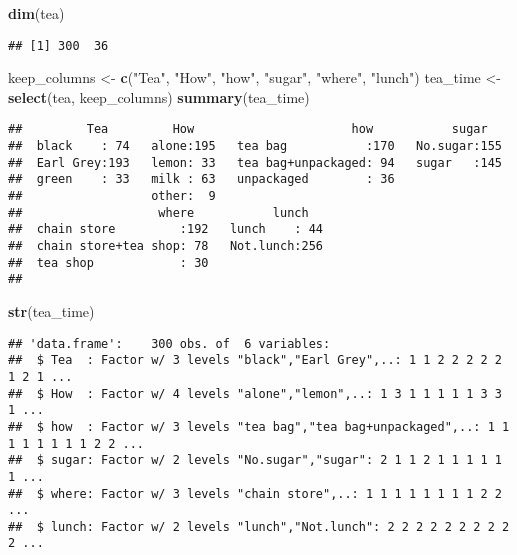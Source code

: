 \documentclass[]{article}
\newenvironment{Shaded}{\begin{snugshade}}{\end{snugshade}}
\newcommand{\KeywordTok}[1]{\textcolor[rgb]{0.13,0.29,0.53}{\textbf{#1}}}
\newcommand{\NormalTok}[1]{#1}
\newcommand{\StringTok}[1]{\textcolor[rgb]{0.31,0.60,0.02}{#1}}
\begin{document}
\begin{Shaded}
\begin{Highlighting}[]
\KeywordTok{dim}\NormalTok{(tea)}
\end{Highlighting}
\end{Shaded}

\begin{verbatim}
## [1] 300  36
\end{verbatim}

\begin{Shaded}
\begin{Highlighting}[]
\NormalTok{keep_columns <-}\StringTok{ }\KeywordTok{c}\NormalTok{(}\StringTok{"Tea"}\NormalTok{, }\StringTok{"How"}\NormalTok{, }\StringTok{"how"}\NormalTok{, }\StringTok{"sugar"}\NormalTok{, }\StringTok{"where"}\NormalTok{, }\StringTok{"lunch"}\NormalTok{)}
\NormalTok{tea_time <-}\StringTok{ }\KeywordTok{select}\NormalTok{(tea, keep_columns)}
\KeywordTok{summary}\NormalTok{(tea_time)}
\end{Highlighting}
\end{Shaded}

\begin{verbatim}
##         Tea         How                      how           sugar    
##  black    : 74   alone:195   tea bag           :170   No.sugar:155  
##  Earl Grey:193   lemon: 33   tea bag+unpackaged: 94   sugar   :145  
##  green    : 33   milk : 63   unpackaged        : 36                 
##                  other:  9                                          
##                   where           lunch    
##  chain store         :192   lunch    : 44  
##  chain store+tea shop: 78   Not.lunch:256  
##  tea shop            : 30                  
## 
\end{verbatim}

\begin{Shaded}
\begin{Highlighting}[]
\KeywordTok{str}\NormalTok{(tea_time)}
\end{Highlighting}
\end{Shaded}

\begin{verbatim}
## 'data.frame':    300 obs. of  6 variables:
##  $ Tea  : Factor w/ 3 levels "black","Earl Grey",..: 1 1 2 2 2 2 2 1 2 1 ...
##  $ How  : Factor w/ 4 levels "alone","lemon",..: 1 3 1 1 1 1 1 3 3 1 ...
##  $ how  : Factor w/ 3 levels "tea bag","tea bag+unpackaged",..: 1 1 1 1 1 1 1 1 2 2 ...
##  $ sugar: Factor w/ 2 levels "No.sugar","sugar": 2 1 1 2 1 1 1 1 1 1 ...
##  $ where: Factor w/ 3 levels "chain store",..: 1 1 1 1 1 1 1 1 2 2 ...
##  $ lunch: Factor w/ 2 levels "lunch","Not.lunch": 2 2 2 2 2 2 2 2 2 2 ...
\end{verbatim}
\end{document}
